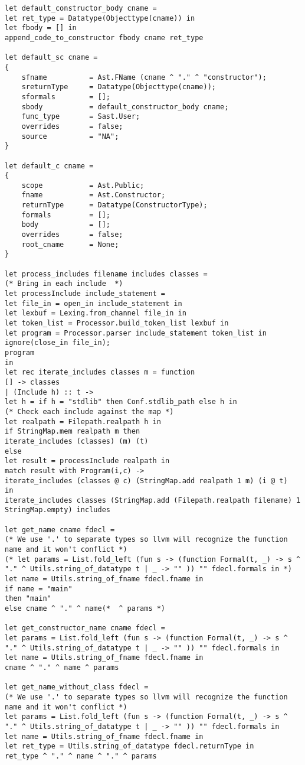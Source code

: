 \begin{verbatim}
let default_constructor_body cname = 
let ret_type = Datatype(Objecttype(cname)) in
let fbody = [] in
append_code_to_constructor fbody cname ret_type

let default_sc cname = 
{
	sfname 			= Ast.FName (cname ^ "." ^ "constructor");
	sreturnType 	= Datatype(Objecttype(cname));
	sformals 		= [];
	sbody 			= default_constructor_body cname;
	func_type		= Sast.User;
	overrides       = false;
	source 			= "NA";
}

let default_c cname = 
{
	scope			= Ast.Public;
	fname 			= Ast.Constructor;
	returnType 		= Datatype(ConstructorType);
	formals 		= [];
	body 			= [];
	overrides 		= false;
	root_cname 		= None;
}

let process_includes filename includes classes =
(* Bring in each include  *)
let processInclude include_statement = 
let file_in = open_in include_statement in
let lexbuf = Lexing.from_channel file_in in
let token_list = Processor.build_token_list lexbuf in
let program = Processor.parser include_statement token_list in
ignore(close_in file_in);
program
in
let rec iterate_includes classes m = function
[] -> classes
| (Include h) :: t -> 
let h = if h = "stdlib" then Conf.stdlib_path else h in
(* Check each include against the map *)
let realpath = Filepath.realpath h in
if StringMap.mem realpath m then 
iterate_includes (classes) (m) (t)
else 
let result = processInclude realpath in 
match result with Program(i,c) ->
iterate_includes (classes @ c) (StringMap.add realpath 1 m) (i @ t)
in
iterate_includes classes (StringMap.add (Filepath.realpath filename) 1 StringMap.empty) includes

let get_name cname fdecl = 
(* We use '.' to separate types so llvm will recognize the function name and it won't conflict *)
(* let params = List.fold_left (fun s -> (function Formal(t, _) -> s ^ "." ^ Utils.string_of_datatype t | _ -> "" )) "" fdecl.formals in *)
let name = Utils.string_of_fname fdecl.fname in
if name = "main" 
then "main"
else cname ^ "." ^ name(*  ^ params *)

let get_constructor_name cname fdecl = 
let params = List.fold_left (fun s -> (function Formal(t, _) -> s ^ "." ^ Utils.string_of_datatype t | _ -> "" )) "" fdecl.formals in
let name = Utils.string_of_fname fdecl.fname in
cname ^ "." ^ name ^ params

let get_name_without_class fdecl = 
(* We use '.' to separate types so llvm will recognize the function name and it won't conflict *)
let params = List.fold_left (fun s -> (function Formal(t, _) -> s ^ "." ^ Utils.string_of_datatype t | _ -> "" )) "" fdecl.formals in
let name = Utils.string_of_fname fdecl.fname in
let ret_type = Utils.string_of_datatype fdecl.returnType in
ret_type ^ "." ^ name ^ "." ^ params


\end{verbatim}
